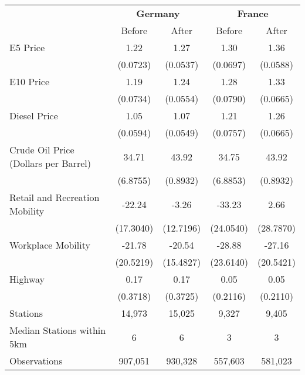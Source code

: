 \begin{tabular}{l*{4}{c}}
\toprule
                    &\multicolumn{2}{c}{\textbf{Germany}}&\multicolumn{2}{c}{\textbf{France}}\\\cmidrule(lr){2-3}\cmidrule(lr){4-5}
                    &\multicolumn{1}{c}{Before}&\multicolumn{1}{c}{After}&\multicolumn{1}{c}{Before}&\multicolumn{1}{c}{After}\\
\midrule
E5 Price            &        1.22&        1.27&        1.30&        1.36\\
                    &    (0.0723)&    (0.0537)&    (0.0697)&    (0.0588)\\
E10 Price           &        1.19&        1.24&        1.28&        1.33\\
                    &    (0.0734)&    (0.0554)&    (0.0790)&    (0.0665)\\
Diesel Price        &        1.05&        1.07&        1.21&        1.26\\
                    &    (0.0594)&    (0.0549)&    (0.0757)&    (0.0665)\\
Crude Oil Price (Dollars per Barrel)&       34.71&       43.92&       34.75&       43.92\\
                    &    (6.8755)&    (0.8932)&    (6.8853)&    (0.8932)\\
Retail and Recreation Mobility&      -22.24&       -3.26&      -33.23&        2.66\\
                    &   (17.3040)&   (12.7196)&   (24.0540)&   (28.7870)\\
Workplace Mobility  &      -21.78&      -20.54&      -28.88&      -27.16\\
                    &   (20.5219)&   (15.4827)&   (23.6140)&   (20.5421)\\
Highway             &        0.17&        0.17&        0.05&        0.05\\
                    &    (0.3718)&    (0.3725)&    (0.2116)&    (0.2110)\\
\midrule
Stations            &      14,973&      15,025&       9,327&       9,405\\
Median Stations within 5km&           6&           6&           3&           3\\
Observations        &     907,051&     930,328&     557,603&     581,023\\
\bottomrule
\end{tabular}
